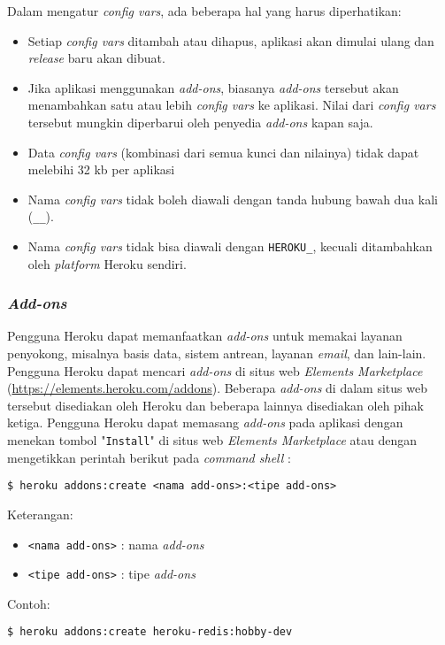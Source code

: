 Dalam mengatur \textit{config vars}, ada beberapa hal yang harus diperhatikan:
\begin{itemize}
\item Setiap \textit{config vars} ditambah atau dihapus, aplikasi akan dimulai ulang dan \textit{release} baru akan dibuat.
\item Jika aplikasi menggunakan \textit{add-ons}, biasanya \textit{add-ons} tersebut akan menambahkan satu atau lebih \textit{config vars} ke aplikasi. Nilai dari \textit{config vars} tersebut mungkin diperbarui oleh penyedia \textit{add-ons} kapan saja.
\item Data \textit{config vars} (kombinasi dari semua kunci dan nilainya) tidak dapat melebihi 32 kb per aplikasi
\item Nama \textit{config vars} tidak boleh diawali dengan tanda hubung bawah dua kali (\texttt{\_\_}).
\item Nama \textit{config vars} tidak bisa diawali dengan \texttt{HEROKU\_}, kecuali ditambahkan oleh \textit{platform} Heroku sendiri.
\end{itemize}

\subsubsection{\textit{Add-ons}}
Pengguna Heroku dapat memanfaatkan \textit{add-ons} untuk memakai layanan penyokong, misalnya basis data, sistem antrean, layanan \textit{email}, dan lain-lain. Pengguna Heroku dapat mencari \textit{add-ons} di situs web \textit{Elements Marketplace} (\url{https://elements.heroku.com/addons}). Beberapa \textit{add-ons} di dalam situs web tersebut disediakan oleh Heroku dan beberapa lainnya disediakan oleh pihak ketiga. Pengguna Heroku dapat memasang \textit{add-ons} pada aplikasi dengan menekan tombol "\texttt{Install}" di situs web \textit{Elements Marketplace} atau dengan mengetikkan perintah berikut pada \textit{command shell} :
\begin{lstlisting}
$ heroku addons:create <nama add-ons>:<tipe add-ons>
\end{lstlisting}
Keterangan:
\begin{itemize}
\item \texttt{<nama add-ons>} : nama \textit{add-ons}
\item \texttt{<tipe add-ons>} : tipe \textit{add-ons}
\end{itemize}
Contoh:
\begin{lstlisting}
$ heroku addons:create heroku-redis:hobby-dev
\end{lstlisting}

